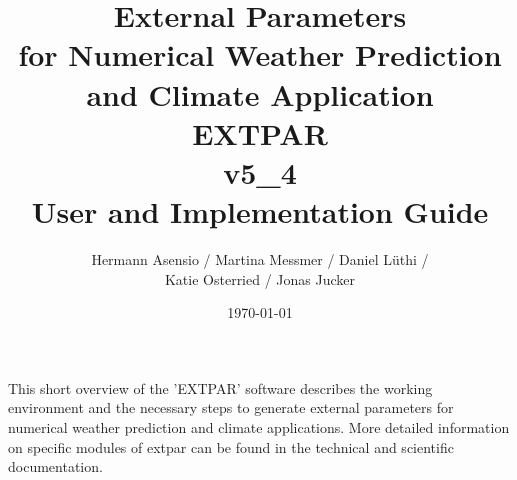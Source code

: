 \documentclass[a4paper,10pt,DIV14,BCOR1cm,titlepage,twoside]{scrartcl}
\title{External Parameters \\ 
for Numerical Weather Prediction 
and Climate Application \\
EXTPAR\\
v5\_4 \\
User and Implementation Guide}
\author{
  Hermann Asensio / Martina Messmer / Daniel L\"uthi / \\
  Katie Osterried / Jonas Jucker
}
\date{\today}
\begin{document}
  

\renewcommand{\thefootnote}{\fnsymbol{footnote}}  

\maketitle  
\renewcommand{\thefootnote}{\arabic{footnote}}  

\cleardoublepage

\tableofcontents

\cleardoublepage


\noindent This short overview of the 'EXTPAR' software describes the working environment and the necessary steps to generate external parameters for numerical weather prediction and climate applications. More detailed information on specific modules of extpar can be found in the technical and scientific documentation.\par\medskip\noindent
\end{document}
